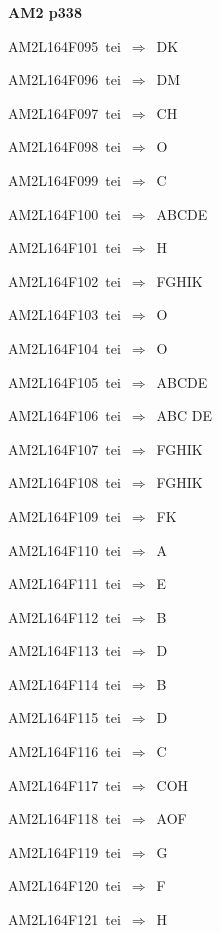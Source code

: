 \par\vfill\eject
{\bf\hfill AM2 p338\hfill\hbox{}}\par\bigskip
{\sixrm AM2L164F095\ {\sixit tei}\ }$\Rightarrow$\ DK\par\smallskip
{\sixrm AM2L164F096\ {\sixit tei}\ }$\Rightarrow$\ DM\par\smallskip
{\sixrm AM2L164F097\ {\sixit tei}\ }$\Rightarrow$\ CH\par\smallskip
{\sixrm AM2L164F098\ {\sixit tei}\ }$\Rightarrow$\ O\par\smallskip
{\sixrm AM2L164F099\ {\sixit tei}\ }$\Rightarrow$\ C\par\smallskip
{\sixrm AM2L164F100\ {\sixit tei}\ }$\Rightarrow$\ ABCDE\par\smallskip
{\sixrm AM2L164F101\ {\sixit tei}\ }$\Rightarrow$\ H\par\smallskip
{\sixrm AM2L164F102\ {\sixit tei}\ }$\Rightarrow$\ FGHIK\par\smallskip
{\sixrm AM2L164F103\ {\sixit tei}\ }$\Rightarrow$\ O\par\smallskip
{\sixrm AM2L164F104\ {\sixit tei}\ }$\Rightarrow$\ O\par\smallskip
{\sixrm AM2L164F105\ {\sixit tei}\ }$\Rightarrow$\ ABCDE\par\smallskip
{\sixrm AM2L164F106\ {\sixit tei}\ }$\Rightarrow$\ ABC
DE\par\smallskip
{\sixrm AM2L164F107\ {\sixit tei}\ }$\Rightarrow$\ FGHIK\par\smallskip
{\sixrm AM2L164F108\ {\sixit tei}\ }$\Rightarrow$\ FGHIK\par\smallskip
{\sixrm AM2L164F109\ {\sixit tei}\ }$\Rightarrow$\ FK\par\smallskip
{\sixrm AM2L164F110\ {\sixit tei}\ }$\Rightarrow$\ A\par\smallskip
{\sixrm AM2L164F111\ {\sixit tei}\ }$\Rightarrow$\ E\par\smallskip
{\sixrm AM2L164F112\ {\sixit tei}\ }$\Rightarrow$\ B\par\smallskip
{\sixrm AM2L164F113\ {\sixit tei}\ }$\Rightarrow$\ D\par\smallskip
{\sixrm AM2L164F114\ {\sixit tei}\ }$\Rightarrow$\ B\par\smallskip
{\sixrm AM2L164F115\ {\sixit tei}\ }$\Rightarrow$\ D\par\smallskip
{\sixrm AM2L164F116\ {\sixit tei}\ }$\Rightarrow$\ C\par\smallskip
{\sixrm AM2L164F117\ {\sixit tei}\ }$\Rightarrow$\ COH\par\smallskip
{\sixrm AM2L164F118\ {\sixit tei}\ }$\Rightarrow$\ AOF\par\smallskip
{\sixrm AM2L164F119\ {\sixit tei}\ }$\Rightarrow$\ G\par\smallskip
{\sixrm AM2L164F120\ {\sixit tei}\ }$\Rightarrow$\ F\par\smallskip
{\sixrm AM2L164F121\ {\sixit tei}\ }$\Rightarrow$\ H\par\smallskip

